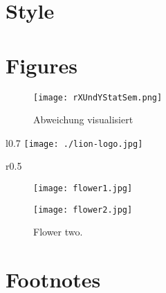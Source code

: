 \section{Style}
\usepackage[doublespacing]{setspace} %

\section{Figures}

\begin{figure}[H]
  \centering\texttt{[image: rXUndYStatSem.png]}
  \caption{Abweichung visualisiert\cite{statistikSeminar}}
  \label{fig:rUndXY}
\end{figure}


\begin{wrapfigure}{l}{0.7\linewidth}
  \texttt{[image: ./lion-logo.jpg]}
  \caption{This is the former Share\LaTeX{} logo}
  \label{fig:_name_}
\end{wrapfigure}

\begin{wrapfigure}{r}{0.5\textwidth}
    \vspace{-25pt}
    \vspace{-20pt}
  \caption{Triangulation \cite{poleTagging}}
  \label{fig:triang}
    \vspace{-6pt}
\end{wrapfigure}

\begin{figure}[!tbp]
  \centering
  \begin{minipage}[b]{0.4\textwidth}
    \texttt{[image: flower1.jpg]}
    \caption{Flower one.}
  \end{minipage}
  \hfill
  \begin{minipage}[b]{0.4\textwidth}
    \texttt{[image: flower2.jpg]}
    \caption{Flower two.}
  \end{minipage}
\end{figure}


\section{Footnotes}

